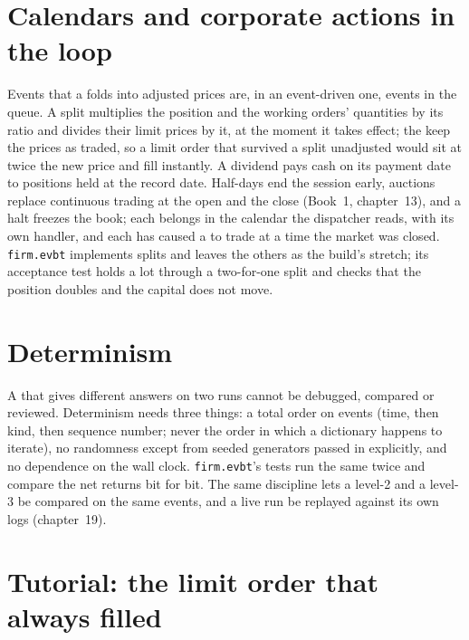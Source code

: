 \section{Calendars and corporate actions in the loop}

Events that a  folds into adjusted prices are, in an event-driven one, events in the queue. A split multiplies the position and the
working orders' quantities by its ratio and divides their limit prices by it, at the moment it takes effect; the  keep the prices as traded, so a
limit order that survived a split unadjusted would sit at twice the new price and fill instantly. A dividend pays cash on its payment date to positions
held at the record date. Half-days end the session early, auctions replace continuous trading at the open and the close (Book~1, chapter~13), and a halt
freezes the book; each belongs in the calendar the dispatcher reads, with its own handler, and each has caused a  to trade at a time the market
was closed. \texttt{firm.evbt} implements splits and leaves the others as the build's stretch; its acceptance test holds a lot through a two-for-one
split and checks that the position doubles and the capital does not move.

\section{Determinism}

A  that gives different answers on two runs cannot be debugged, compared or reviewed. Determinism needs three things: a total order on events
(time, then kind, then sequence number; never the order in which a dictionary happens to iterate), no randomness except from seeded generators passed
in explicitly, and no dependence on the wall clock. \texttt{firm.evbt}'s tests run the same  twice and compare the net returns bit for bit. The
same discipline lets a level-2 and a level-3  be compared on the same events, and a live run be replayed against its own logs (chapter~19).

\section{Tutorial: the limit order that always filled}\label{tut:rs:event-driven-backtests:tut}

